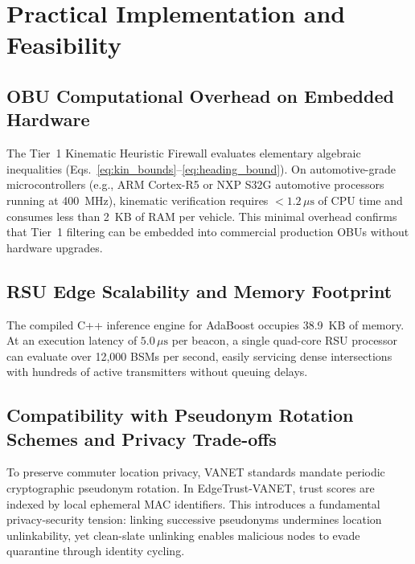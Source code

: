 \documentclass[conference]{IEEEtran}
\begin{document}
\section{Practical Implementation and Feasibility}

\subsection{OBU Computational Overhead on Embedded Hardware}

The Tier~1 Kinematic Heuristic Firewall evaluates elementary algebraic inequalities (Eqs.~\ref{eq:kin_bounds}--\ref{eq:heading_bound}). On automotive-grade microcontrollers (e.g., ARM Cortex-R5 or NXP S32G automotive processors running at 400~MHz), kinematic verification requires $<1.2\,\mu\text{s}$ of CPU time and consumes less than 2~KB of RAM per vehicle. This minimal overhead confirms that Tier~1 filtering can be embedded into commercial production OBUs without hardware upgrades.

\subsection{RSU Edge Scalability and Memory Footprint}

The compiled C++ inference engine for AdaBoost occupies 38.9~KB of memory. At an execution latency of $5.0\,\mu\text{s}$ per beacon, a single quad-core RSU processor can evaluate over 12,000 BSMs per second, easily servicing dense intersections with hundreds of active transmitters without queuing delays.

\subsection{Compatibility with Pseudonym Rotation Schemes and Privacy Trade-offs}

To preserve commuter location privacy, VANET standards mandate periodic cryptographic pseudonym rotation. In EdgeTrust-VANET, trust scores are indexed by local ephemeral MAC identifiers. This introduces a fundamental privacy-security tension: linking successive pseudonyms undermines location unlinkability, yet clean-slate unlinking enables malicious nodes to evade quarantine through identity cycling. 
\end{document}
